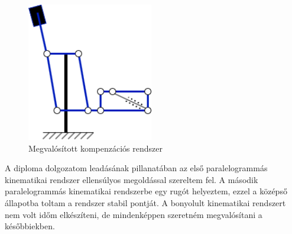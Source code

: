 \begin{figure}[!ht]
\centering
\includegraphics[width=55mm, keepaspectratio]{figures/Diagrammok/Megvalositott_kompenzacio}
\caption{Megvalósított kompenzációs rendszer}
\label{fig:Megvalositott_kompenzacio}
\end{figure}


A diploma dolgozatom leadásának pillanatában az első paralelogrammás kinematikai rendszer ellensúlyos megoldással szereltem fel. A második paralelogrammás  kinematikai rendszerbe egy rugót helyeztem, ezzel a középső állapotba toltam a rendszer stabil pontját. A bonyolult kinematikai rendszert nem volt időm elkészíteni, de mindenképpen szeretném megvalósítani a későbbiekben.
